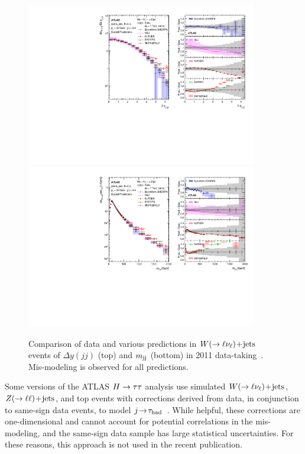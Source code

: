 \clearpage
\begin{figure}[tp]
  \centering
  \includegraphics[width=0.90\textwidth]{figures/STDM-2012-24/fig_26a}
  \includegraphics[width=0.90\textwidth]{figures/STDM-2012-24/fig_28a}
  \caption{Comparison of data and various predictions in $W (\rightarrow \ell\nu_\ell)\!+\!\text{jets}$ events of $\Delta y(jj)$ (top) and $m_{\text{jj}}$ (bottom) in 2011 data-taking~\cite{STDM-2012-24}. Mis-modeling is observed for all predictions.}
  \label{fig:backgrounds-wjets}
\end{figure}
\clearpage

Some versions of the ATLAS $H\rightarrow\tau\tau$ analysis use simulated $W (\rightarrow \ell\nu_\ell)\!+\!\text{jets}$, $Z (\rightarrow \ell\ell)\!+\!\text{jets}$, and top events with corrections derived from data, in conjunction to same-sign data events, to model $j\!\rightarrow\!\tau_\text{had}$~\cite{HIGG-2012-07,ATLAS-CONF-2012-160}. While helpful, these corrections are one-dimensional and cannot account for potential correlations in the mis-modeling, and the same-sign data sample has large statistical uncertainties. For these reasons, this approach is not used in the recent publication.

